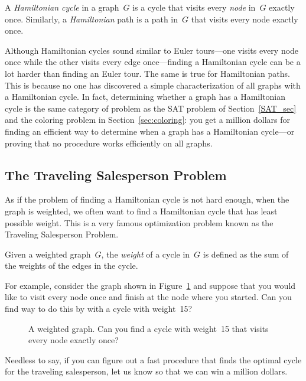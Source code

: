 \begin{editingnotes}
\begin{definition}\label{def:hamiltonian-cycle}
A \emph{Hamiltonian cycle} in a graph~$G$ is a cycle that visits every
\emph{node} in~$G$ exactly once.  Similarly, a \emph{Hamiltonian} path
is a path in~$G$ that visits every node exactly once.
\end{definition}

Although Hamiltonian cycles sound similar to Euler tours---one visits
every node once while the other visits every edge once---finding a
Hamiltonian cycle can be a lot harder than finding an Euler tour.  The
same is true for Hamiltonian paths.  This is because no one has
discovered a simple characterization of all graphs with a Hamiltonian
cycle.  In fact, determining whether a graph has a Hamiltonian cycle
is the same category of problem as the SAT problem of
Section~\ref{SAT_sec} and the coloring problem in
Section~\ref{sec:coloring}: you get a million dollars for finding an
efficient way to determine when a graph has a Hamiltonian cycle---or
proving that no procedure works efficiently on all graphs.

\subsection{The Traveling Salesperson Problem}

As if the problem of finding a Hamiltonian cycle is not hard enough,
when the graph is weighted, we often want to find a Hamiltonian cycle
that has least possible weight.  This is a very famous optimization
problem known as the Traveling Salesperson Problem.

\begin{definition}
Given a weighted graph~$G$, the \emph{weight} of a cycle in~$G$ is
defined as the sum of the weights of the edges in the cycle.
\end{definition}

For example, consider the graph shown in Figure~\ref{fig:5AL} and
suppose that you would like to visit every node once and finish at the
node where you started.  Can you find  way to do this by with a
cycle with weight~15?

\begin{figure}


\caption{A weighted graph.  Can you find a cycle with weight~15 that
  visits every node exactly once?}

\label{fig:5AL}
\end{figure}

Needless to say, if you can figure out a fast procedure that finds the
optimal cycle for the traveling salesperson, let us know so that we
can win a million dollars.
\end{editingnotes}

